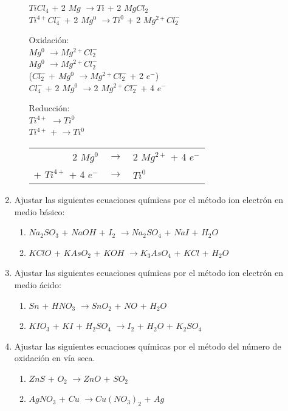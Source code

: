 \documentclass[../Práctica.root.tex]{subfiles}
\newcommand{\lra}{\ensuremath{\longrightarrow{}}}
\begin{document}
\begin{enumerate}
\begin{enumerate}
                    $TiCl_4$ + 2 $Mg$ \lra $Ti$ + 2 $MgCl_2$ \\
                    $Ti^{4+}Cl^-_4$ + 2 $Mg^0$ \lra $Ti^0$ + 2 $Mg^{2+}Cl^-_2$
                    \begin{multicols}{2}
                        Oxidación: \\
                        $Mg^0$ \lra $Mg^{2+}Cl_2^-$ \\
                         $Mg^0$ \lra $Mg^{2+}Cl_2^-$  \\
                        ($Cl_2^-$ + $Mg^0$ \lra $Mg^{2+}Cl_2^-$ + 2 $e^-$)\cdot{} \\
                        $Cl_4^-$ + 2 $Mg^0$ \lra 2 $Mg^{2+}Cl_2^-$ + 4 $e^-$

                        \columnbreak

                        Reducción: \\
                        $Ti^{4+}$ \lra $Ti^0$ \\
                        $Ti^{4+}$ +  \lra $Ti^0$
                    \end{multicols}
                    \begin{tabular}{ r c l }
                        2 $Mg^0$              & \lra & 2 $Mg^{2+}$ + 4 $e^-$ \\
                        + $Ti^{4+}$ + 4 $e^-$ & \lra & $Ti^0$
                    \end{tabular}

          \end{enumerate}

    \item Ajustar las siguientes ecuaciones químicas por el método ion electrón en medio básico:
          \begin{enumerate}
              \item $Na_2SO_3$ + $NaOH$ + $I_2$ \lra $Na_2SO_4$ + $NaI$ + $H_2O$
              \item $KClO$ + $KAsO_2$ + $KOH$ \lra $K_3AsO_4$ + $KCl$ + $H_2O$
          \end{enumerate}

    \item Ajustar las siguientes ecuaciones químicas por el método ion electrón en medio ácido:
          \begin{enumerate}
              \item $Sn$ + $HNO_3$ \lra $SnO_2$ + $NO$ + $H_2O$
              \item $KIO_3$ + $KI$ + $H_2SO_4$ \lra $I_2$ + $H_2O$ + $K_2SO_4$
          \end{enumerate}

    \item Ajustar las siguientes ecuaciones químicas por el método del número de oxidación en vía
          seca.
          \begin{enumerate}
              \item $ZnS$ + $O_2$ \lra $ZnO$ + $SO_2$
              \item $AgNO_3$ + $Cu$ \lra $Cu(NO_3)_2$ + $Ag$
          \end{enumerate}
\end{enumerate}
\end{document}

